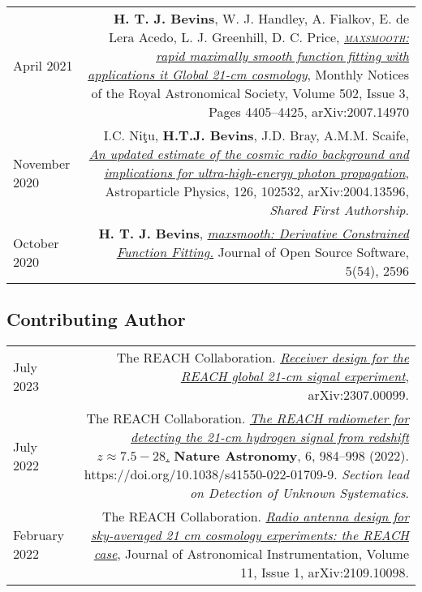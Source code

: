 \documentclass{article}
\begin{document}
\begin{tabular}{L!{\vrule}R}
	April 2021 & \textbf{H. T. J. Bevins}, W. J. Handley, A. Fialkov, E. de Lera Acedo, L. J. Greenhill, D. C. Price, \href{https://academic.oup.com/mnras/article/502/3/4405/6105349?guestAccessKey=769d7461-cc0b-4d83-9cdf-bc351056d911}{\textit{\textsc{maxsmooth}: rapid maximally smooth function fitting with applications it Global 21-cm cosmology}}, Monthly Notices of the Royal Astronomical Society, Volume 502, Issue 3, Pages 4405–4425, 
    arXiv:2007.14970\\
	November 2020 & I.C. Ni\c{t}u, \textbf{H.T.J. Bevins}, J.D. Bray, A.M.M. Scaife, \href{https://www.sciencedirect.com/science/article/pii/S0927650520301043?via\%3Dihub}{\textit{An updated estimate of the cosmic radio background and implications for ultra-high-energy photon propagation}}, Astroparticle Physics, 126, 102532, arXiv:2004.13596, \textit{Shared First Authorship}. \\
	October 2020 & \textbf{H. T. J. Bevins}, \href{https://joss.theoj.org/papers/10.21105/joss.02596}{\textit{maxsmooth: Derivative Constrained Function Fitting.}} Journal of Open Source Software, 5(54), 2596 \\
\end{tabular}

\subsection*{Contributing Author}

\begin{tabular}{L!{\vrule}R}
    July 2023 & The REACH Collaboration. \href{https://arxiv.org/abs/2307.00099}{\textit{Receiver design for the REACH global 21-cm signal experiment}}, arXiv:2307.00099. \\
	July 2022 & The REACH Collaboration. \href{https://www.nature.com/articles/s41550-022-01709-9?utm_campaign=related_content&utm_source=ASTRO&utm_medium=communities}{\textit{The REACH radiometer for detecting the 21-cm hydrogen signal from redshift $z \approx 7.5 -28$.}} \textbf{Nature Astronomy}, 6, 984–998 (2022). https://doi.org/10.1038/s41550-022-01709-9. \textit{Section lead on Detection of Unknown Systematics}. \\
	February 2022 & The REACH Collaboration. \href{https://ui.adsabs.harvard.edu/abs/2021arXiv210910098C/abstract}{\textit{Radio antenna design for sky-averaged 21 cm cosmology experiments: the REACH case}}, Journal of Astronomical Instrumentation, Volume 11, Issue 1, arXiv:2109.10098. \\
\end{tabular}
\end{document}
